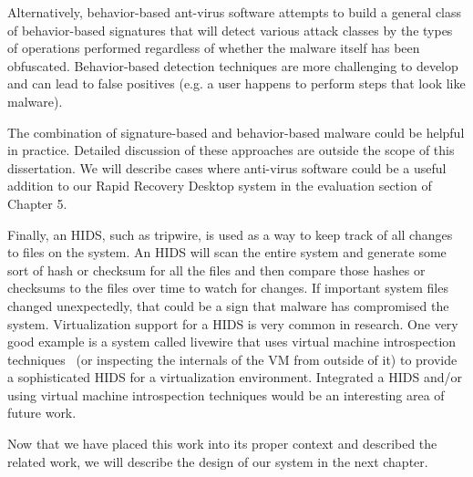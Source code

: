 Alternatively, behavior-based ant-virus software attempts to build a general class of behavior-based signatures that will detect various attack classes by the types of operations performed regardless of whether the malware itself has been obfuscated. Behavior-based detection techniques are more challenging to develop and can lead to false positives (e.g. a user happens to perform steps that look like malware).

The combination of signature-based and behavior-based malware could be helpful in practice. Detailed discussion of these approaches are outside the scope of this dissertation. We will describe cases where anti-virus software could be a useful addition to our Rapid Recovery Desktop system in the evaluation section of Chapter 5.

Finally, an HIDS, such as tripwire\cite{kim_1994}, is used as a way to keep track of all changes to files on the system. An HIDS will scan the entire system and generate some sort of hash or checksum for all the files and then compare those hashes or checksums to the files over time to watch for changes. If important system files changed unexpectedly, that could be a sign that malware has compromised the system. Virtualization support for a HIDS is very common in research. One very good example is a system called livewire\cite{VMI_IDS_2003} that uses virtual machine introspection techniques~\cite{xenaccess_07,vmsafe_news_2008} (or inspecting the internals of the VM from outside of it) to provide a sophisticated HIDS for a virtualization environment. Integrated a HIDS and/or using virtual machine introspection techniques would be an interesting area of future work.

Now that we have placed this work into its proper context and described the related work, we will describe the design of our system in the next chapter.


